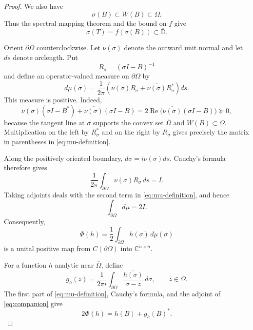 \documentclass[11pt]{article}
\newcommand{\D}{\mathbb D}
\newcommand{\C}{\mathbb C}
\newcommand{\RePart}{\operatorname{Re}}
\begin{document}
\begin{proof}
We also have
\[
 \sigma(B)\subset W(B)\subset\Omega.
\]
Thus the spectral mapping theorem and the bound on \(f\) give
\[
 \sigma(T)=f(\sigma(B))\subset\overline{\D}.
\]

Orient \(\partial\Omega\) counterclockwise.  Let \(\nu(\sigma)\) denote
the outward unit normal and let \(ds\) denote arclength.  Put
\[
 R_\sigma=(\sigma I-B)^{-1}
\]
and define an operator-valued measure on \(\partial\Omega\) by
\begin{equation}
 d\mu(\sigma)=\frac1{2\pi}
 \left(\nu(\sigma)R_\sigma+
 \overline{\nu(\sigma)}R_\sigma^*\right)ds.
 \label{eq:mu-definition}
\end{equation}
This measure is positive.  Indeed,
\[
 \nu(\sigma)(\overline\sigma I-B^*)+
 \overline{\nu(\sigma)}(\sigma I-B)
 =2\RePart\bigl(\overline{\nu(\sigma)}(\sigma I-B)\bigr)
 \succeq0,
\]
because the tangent line at \(\sigma\) supports the convex set
\(\overline\Omega\) and \(W(B)\subset\Omega\).  Multiplication on the left
by \(R_\sigma^*\) and on the right by \(R_\sigma\) gives precisely the
matrix in parentheses in \eqref{eq:mu-definition}.

Along the positively oriented boundary, \(d\sigma=i\nu(\sigma)ds\).
Cauchy's formula therefore gives
\[
 \frac1{2\pi}\int_{\partial\Omega}
 \nu(\sigma)R_\sigma\,ds=I.
\]
Taking adjoints deals with the second term in
\eqref{eq:mu-definition}, and hence
\begin{equation}
 \int_{\partial\Omega}d\mu=2I.
 \label{eq:mu-mass}
\end{equation}
Consequently,
\begin{equation}
 \Phi(h)=\frac12\int_{\partial\Omega}h(\sigma)\,d\mu(\sigma)
 \label{eq:Phi}
\end{equation}
is a unital positive map from \(C(\partial\Omega)\) into
\(\C^{n\times n}\).

For a function \(h\) analytic near \(\overline\Omega\), define
\begin{equation}
 g_h(z)=\frac1{2\pi i}\int_{\partial\Omega}
 \frac{\overline{h(\sigma)}}{\sigma-z}\,d\sigma,
 \qquad z\in\Omega.
 \label{eq:companion}
\end{equation}
The first part of \eqref{eq:mu-definition}, Cauchy's formula, and the
adjoint of \eqref{eq:companion} give
\begin{equation}
 2\Phi(h)=h(B)+g_h(B)^*.
 \label{eq:Phi-identity}
\end{equation}


\end{proof}
\end{document}
